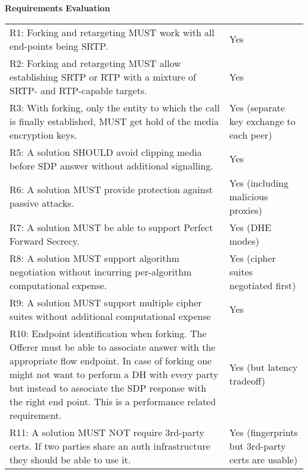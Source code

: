 \documentclass[helvetica,fancybox,landscape]{seminar}
\newcommand{\heading}[1]{%
  \begin{center} 
    \large\bf 
    #1 
  \end{center} 
  \vspace{.4 in}}
\begin{document}
\begin{slide}
\heading{Requirements Evaluation}

{\tiny
\begin{tabular}{p{3 in} p{1 in}}
R1: Forking and retargeting MUST work with all end-points being SRTP. & Yes \\
R2: Forking and retargeting MUST allow establishing SRTP or RTP with a mixture of SRTP- and RTP-capable targets. & Yes \\
R3: With forking, only the entity to which the call is finally established, MUST get hold of the media encryption keys. & Yes (separate key exchange to each peer)\\
R5: A solution SHOULD avoid clipping media before SDP answer without additional signalling. & Yes \\
R6: A solution MUST provide protection against passive attacks. & Yes (including malicious proxies)\\ 
R7: A solution MUST be able to support Perfect Forward Secrecy. & Yes (DHE modes) \\
R8: A solution MUST support algorithm negotiation without incurring per-algorithm computational expense. & Yes (cipher suites negotiated first) \\
R9: A solution MUST support multiple cipher suites without additional computational expense & Yes \\
R10:  Endpoint identification when forking.  The Offerer must be able to associate answer with the appropriate flow endpoint.  In case of forking one might not want to perform a DH with every party but instead to associate the SDP response with the right end point. This is a performance related requirement. & Yes (but latency tradeoff) \\
R11: A solution MUST NOT require 3rd-party certs.  If two parties share an auth infrastructure they should be able to use it. & Yes (fingerprints but 3rd-party certs are usable)
\end{tabular}
}
\end{slide}
\end{document}
